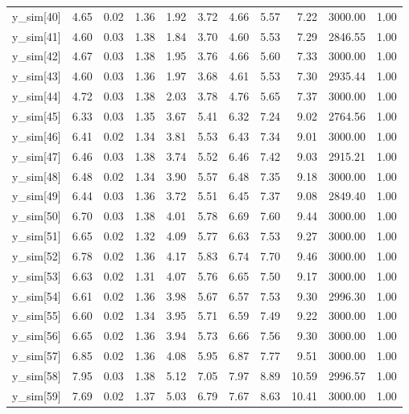 \begin{table}[ht]
\begin{tabular}{rrrrrrrrrrr}
  y\_sim[40] & 4.65 & 0.02 & 1.36 & 1.92 & 3.72 & 4.66 & 5.57 & 7.22 & 3000.00 & 1.00 \\ 
  y\_sim[41] & 4.60 & 0.03 & 1.38 & 1.84 & 3.70 & 4.60 & 5.53 & 7.29 & 2846.55 & 1.00 \\ 
  y\_sim[42] & 4.67 & 0.03 & 1.38 & 1.95 & 3.76 & 4.66 & 5.60 & 7.33 & 3000.00 & 1.00 \\ 
  y\_sim[43] & 4.60 & 0.03 & 1.36 & 1.97 & 3.68 & 4.61 & 5.53 & 7.30 & 2935.44 & 1.00 \\ 
  y\_sim[44] & 4.72 & 0.03 & 1.38 & 2.03 & 3.78 & 4.76 & 5.65 & 7.37 & 3000.00 & 1.00 \\ 
  y\_sim[45] & 6.33 & 0.03 & 1.35 & 3.67 & 5.41 & 6.32 & 7.24 & 9.02 & 2764.56 & 1.00 \\ 
  y\_sim[46] & 6.41 & 0.02 & 1.34 & 3.81 & 5.53 & 6.43 & 7.34 & 9.01 & 3000.00 & 1.00 \\ 
  y\_sim[47] & 6.46 & 0.03 & 1.38 & 3.74 & 5.52 & 6.46 & 7.42 & 9.03 & 2915.21 & 1.00 \\ 
  y\_sim[48] & 6.48 & 0.02 & 1.34 & 3.90 & 5.57 & 6.48 & 7.35 & 9.18 & 3000.00 & 1.00 \\ 
  y\_sim[49] & 6.44 & 0.03 & 1.36 & 3.72 & 5.51 & 6.45 & 7.37 & 9.08 & 2849.40 & 1.00 \\ 
  y\_sim[50] & 6.70 & 0.03 & 1.38 & 4.01 & 5.78 & 6.69 & 7.60 & 9.44 & 3000.00 & 1.00 \\ 
  y\_sim[51] & 6.65 & 0.02 & 1.32 & 4.09 & 5.77 & 6.63 & 7.53 & 9.27 & 3000.00 & 1.00 \\ 
  y\_sim[52] & 6.78 & 0.02 & 1.36 & 4.17 & 5.83 & 6.74 & 7.70 & 9.46 & 3000.00 & 1.00 \\ 
  y\_sim[53] & 6.63 & 0.02 & 1.31 & 4.07 & 5.76 & 6.65 & 7.50 & 9.17 & 3000.00 & 1.00 \\ 
  y\_sim[54] & 6.61 & 0.02 & 1.36 & 3.98 & 5.67 & 6.57 & 7.53 & 9.30 & 2996.30 & 1.00 \\ 
  y\_sim[55] & 6.60 & 0.02 & 1.34 & 3.95 & 5.71 & 6.59 & 7.49 & 9.22 & 3000.00 & 1.00 \\ 
  y\_sim[56] & 6.65 & 0.02 & 1.36 & 3.94 & 5.73 & 6.66 & 7.56 & 9.30 & 3000.00 & 1.00 \\ 
  y\_sim[57] & 6.85 & 0.02 & 1.36 & 4.08 & 5.95 & 6.87 & 7.77 & 9.51 & 3000.00 & 1.00 \\ 
  y\_sim[58] & 7.95 & 0.03 & 1.38 & 5.12 & 7.05 & 7.97 & 8.89 & 10.59 & 2996.57 & 1.00 \\ 
  y\_sim[59] & 7.69 & 0.02 & 1.37 & 5.03 & 6.79 & 7.67 & 8.63 & 10.41 & 3000.00 & 1.00 \\ 

\end{tabular}
\end{table}
